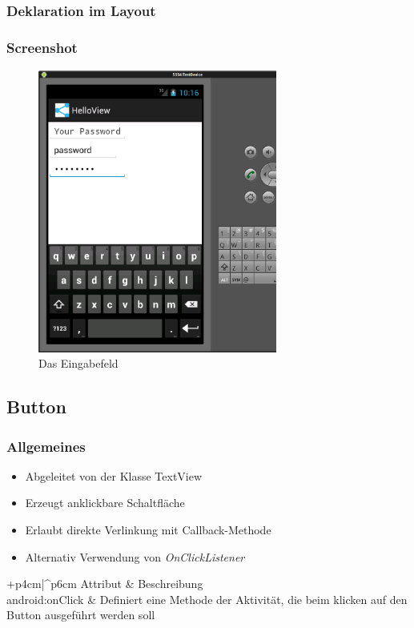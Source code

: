 \begin{frame}
   \frametitle{Deklaration im Layout}
	
\end{frame}

\begin{frame}
   \frametitle{Screenshot}
	\begin{figure}[h!]
	  \centering
	  \includegraphics[width=0.7\textwidth]{pictures/edittext.ps}
	  \caption{
		  Das Eingabefeld
	  }
	  \label{fig:edittext}
	\end{figure}
\end{frame}

\subsection{Button}
\begin{frame}
   \frametitle{Allgemeines}
   \begin{itemize}
      \item Abgeleitet von der Klasse TextView
      \item Erzeugt anklickbare Schaltfläche
      \item Erlaubt direkte Verlinkung mit Callback-Methode
      \item Alternativ Verwendung von \emph{OnClickListener}
   \end{itemize}

	\begin{attrDesc}{+p{4cm}|^p{6cm}}
		Attribut & Beschreibung\\
		\hline
		android:onClick & Definiert eine Methode der Aktivität, die beim 
			klicken auf den Button ausgeführt werden soll\\
	\end{attrDesc}
\end{frame}

